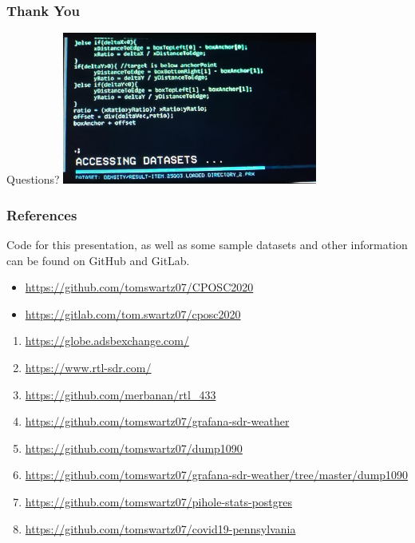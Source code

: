 \documentclass[aspectratio=169]{beamer}
\begin{document}
\begin{frame}
  \frametitle{Thank You}
  \begin{center}
    \LARGE{Questions?}
    \vfill
    \includegraphics[height=5cm]{images/lol-code.jpg}
  \end{center}
\end{frame}
\begin{frame}[fragile]
  \frametitle{References}
  Code for this presentation, as well as some sample datasets and other information
  can be found on GitHub and GitLab.
  \begin{itemize}
    \item{\href{https://github.com/tomswartz07/CPOSC2020}{https://github.com/tomswartz07/CPOSC2020}}
    \item{\href{https://gitlab.com/tom.swartz07/cposc2020}{https://gitlab.com/tom.swartz07/cposc2020}}
  \end{itemize}
  \begin{enumerate}
    \item{\href{https://globe.adsbexchange.com/}{https://globe.adsbexchange.com/}}
    \item{\href{https://www.rtl-sdr.com/}{https://www.rtl-sdr.com/}}
    \item{\href{https://github.com/merbanan/rtl\_433}{https://github.com/merbanan/rtl\_433}}
    \item{\href{https://github.com/tomswartz07/grafana-sdr-weather}{https://github.com/tomswartz07/grafana-sdr-weather}}
    \item{\href{https://github.com/tomswartz07/dump1090}{https://github.com/tomswartz07/dump1090}}
    \item{\href{https://github.com/tomswartz07/grafana-sdr-weather/tree/master/dump1090}{https://github.com/tomswartz07/grafana-sdr-weather/tree/master/dump1090}}
    \item{\href{https://github.com/tomswartz07/pihole-stats-postgres}{https://github.com/tomswartz07/pihole-stats-postgres}}
    \item{\href{https://github.com/tomswartz07/covid19-pennsylvania}{https://github.com/tomswartz07/covid19-pennsylvania}}
  \end{enumerate}
\end{frame}
\end{document}
